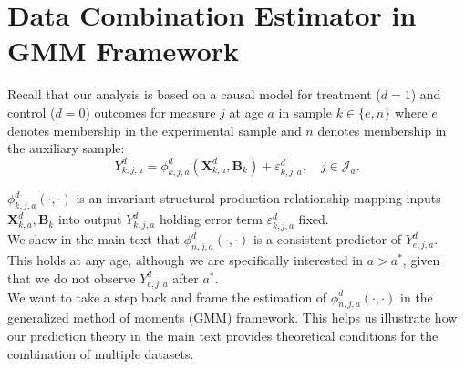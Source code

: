 


\usepackage[stable]{footmisc}

\newcommand*\leftright[2]{%
  \leavevmode
  \rlap{#1}%
  \hspace{0.5\linewidth}%
  #2}

\newcommand{\orth}{\ensuremath{\perp\!\!\!\perp}}%
\newcommand{\indep}{\orth}%
\newcommand{\notorth}{\ensuremath{\perp\!\!\!\!\!\!\diagup\!\!\!\!\!\!\perp}}%
\newcommand{\notindep}{\notorth}






\doublespacing
\section*{Data Combination Estimator in GMM Framework} \label{section:datacomb}

\noindent Recall that our analysis is based on a causal model for treatment ($d=1$) and control ($d=0$) outcomes for measure $j$ at age $a$ in sample $k \in \{e,n\}$ where $e$ denotes membership in the experimental sample and $n$ denotes membership in the auxiliary sample:\\

\begin{equation}\label{eq:outcome}
Y^d_{k,j,a} = \phi^d_{k,j,a} (\bm{X}^d_{k,a}, \bm{B}_k) + \varepsilon^d_{k,j,a}, \quad j \in \mathcal{J}_a.
\end{equation}

\noindent $\phi^d_{k,j,a}\left( \cdot, \cdot \right)$ is an invariant structural production relationship mapping inputs $\bm{X}^d_{k,a}, \bm{B}_k$ into output $Y^d_{k,j,a}$ holding error term $\varepsilon^d_{k,j,a}$ fixed.\\

\noindent We show in the main text that $\phi^d_{n,j,a} (\cdot, \cdot)$ is a consistent predictor of $Y_{e,j,a}^d$. This holds at any age, although we are specifically interested in $a > a^*$, given that we do not observe $Y_{e,j,a}^d$ after $a^*$.\\

\noindent We want to take a step back and frame the estimation of $\phi^d_{n,j,a} (\cdot, \cdot)$ in the generalized method of moments (GMM) framework. This helps us illustrate how our prediction theory in the main text provides theoretical conditions for the combination of multiple datasets.\\

